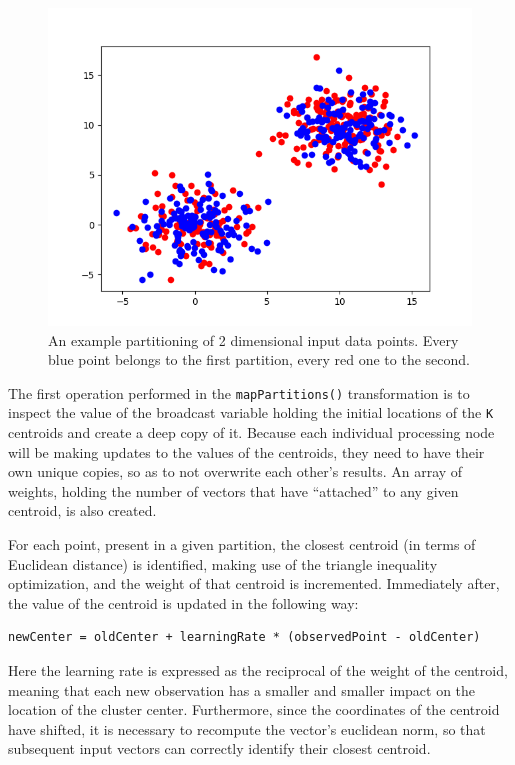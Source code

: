 \documentclass{l4proj}
\begin{document}
\begin{figure}[H]
	\centering
    \includegraphics[width=1.0\textwidth]{images/partitions}
    \caption{An example partitioning of 2 dimensional input data points. Every blue point belongs to the first partition, every red one to the second.} 
    \label{partitions}
\end{figure}

The first operation performed in the \texttt{mapPartitions()} transformation is to inspect the value of the broadcast variable holding the initial locations of the \texttt{K} centroids and create a deep copy of it. Because each individual processing node will be making updates to the values of the centroids, they need to have their own unique copies, so as to not overwrite each other's results. An array of weights, holding the number of vectors that have ``attached'' to any given centroid, is also created.

For each point, present in a given partition, the closest centroid (in terms of Euclidean distance) is identified, making use of the triangle inequality optimization, and the weight of that centroid is incremented. Immediately after, the value of the centroid is updated in the following way:

\begin{center}
\begin{BVerbatim}
newCenter = oldCenter + learningRate * (observedPoint - oldCenter)
\end{BVerbatim}
\end{center}

Here the learning rate is expressed as the reciprocal of the weight of the centroid, meaning that each new observation has a smaller and smaller impact on the location of the cluster center. Furthermore, since the coordinates of the centroid have shifted, it is necessary to recompute the vector's euclidean norm, so that subsequent input vectors can correctly identify their closest centroid. 
\end{document}
